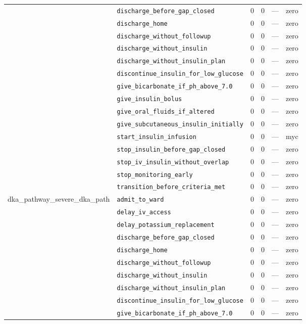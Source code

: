 \begin{table}[ht]
\begin{tabular}{llrrrl}
 & \texttt{discharge\_before\_gap\_closed} & 0 & 0 & — & zero \\
 & \texttt{discharge\_home} & 0 & 0 & — & zero \\
 & \texttt{discharge\_without\_followup} & 0 & 0 & — & zero \\
 & \texttt{discharge\_without\_insulin} & 0 & 0 & — & zero \\
 & \texttt{discharge\_without\_insulin\_plan} & 0 & 0 & — & zero \\
 & \texttt{discontinue\_insulin\_for\_low\_glucose} & 0 & 0 & — & zero \\
 & \texttt{give\_bicarbonate\_if\_ph\_above\_7.0} & 0 & 0 & — & zero \\
 & \texttt{give\_insulin\_bolus} & 0 & 0 & — & zero \\
 & \texttt{give\_oral\_fluids\_if\_altered} & 0 & 0 & — & zero \\
 & \texttt{give\_subcutaneous\_insulin\_initially} & 0 & 0 & — & zero \\
 & \texttt{start\_insulin\_infusion} & 0 & 0 & — & myc \\
 & \texttt{stop\_insulin\_before\_gap\_closed} & 0 & 0 & — & zero \\
 & \texttt{stop\_iv\_insulin\_without\_overlap} & 0 & 0 & — & zero \\
 & \texttt{stop\_monitoring\_early} & 0 & 0 & — & zero \\
 & \texttt{transition\_before\_criteria\_met} & 0 & 0 & — & zero \\
\midrule
dka\_pathway\_severe\_dka\_path & \texttt{admit\_to\_ward} & 0 & 0 & — & zero \\
 & \texttt{delay\_iv\_access} & 0 & 0 & — & zero \\
 & \texttt{delay\_potassium\_replacement} & 0 & 0 & — & zero \\
 & \texttt{discharge\_before\_gap\_closed} & 0 & 0 & — & zero \\
 & \texttt{discharge\_home} & 0 & 0 & — & zero \\
 & \texttt{discharge\_without\_followup} & 0 & 0 & — & zero \\
 & \texttt{discharge\_without\_insulin} & 0 & 0 & — & zero \\
 & \texttt{discharge\_without\_insulin\_plan} & 0 & 0 & — & zero \\
 & \texttt{discontinue\_insulin\_for\_low\_glucose} & 0 & 0 & — & zero \\
 & \texttt{give\_bicarbonate\_if\_ph\_above\_7.0} & 0 & 0 & — & zero \\

\end{tabular}
\end{table}
